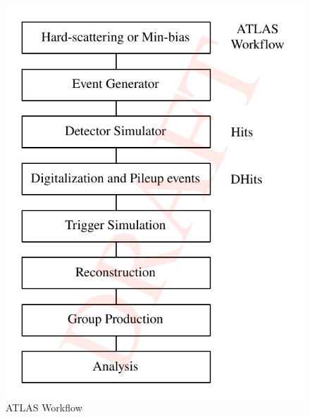 \begin{figure}
  \includegraphics[width=\columnwidth]{figures/atlas_workflow.pdf}
  \caption{ATLAS Workflow}
\label{fig:atlas_workflow}
\end{figure}
